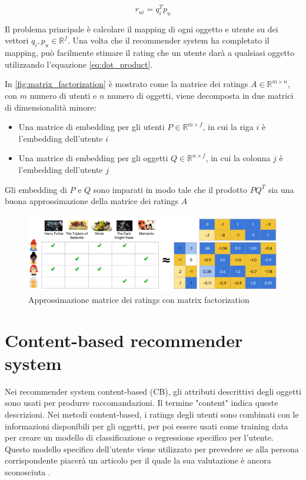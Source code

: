 \documentclass[12pt,italian]{report}
\begin{document}
\begin{equation} \label{eq:dot_product}
r_{ui} = q_i^Tp_u
\end{equation}

Il problema principale è calcolare il mapping di ogni oggetto e utente su dei vettori $q_i, p_u \in \mathbb{R}^f$. Una volta che il recommender system ha completato il mapping, può facilmente stimare il rating che un utente darà a qualsiasi oggetto utilizzando l'equazione \ref{eq:dot_product}. 

In \autoref{fig:matrix_factorization} è mostrato come la matrice dei ratings $A \in \mathbb{R}^{m \times n}$, con $m$ numero di utenti e $n$ numero di oggetti, viene decomposta in due matrici di dimensionalità minore:

\begin{itemize}
	\item Una matrice di embedding per gli utenti $P \in \mathbb{R}^{m \times f}$, in cui la riga $i$ è l'embedding dell'utente $i$
	\item Una matrice di embedding per gli oggetti $Q \in \mathbb{R}^{n \times f}$, in cui la colonna $j$ è l'embedding dell'utente $j$
\end{itemize}

Gli embedding di $P$ e $Q$ sono imparati in modo tale che il prodotto $PQ^T$ sia una buona approssimazione della matrice dei ratings $A$

\begin{figure}
  \includegraphics[width=\linewidth]{immagini/matrix_factorization.pdf}
  \caption{Approssimazione matrice dei ratings con matrix factorization}
  \label{fig:matrix_factorization}
\end{figure}

\section{Content-based recommender system}
Nei recommender system content-based (CB), gli attributi descrittivi degli oggetti sono usati per produrre raccomandazioni. Il termine "content" indica queste descrizioni. Nei metodi content-based, i ratings degli utenti sono combinati con le informazioni disponibili per gli oggetti, per poi essere usati come training data per creare un modello di classificazione o regressione specifico per l'utente. Questo modello specifico dell'utente viene utilizzato per prevedere se alla persona corrispondente piacerà un articolo per il quale la sua valutazione è ancora sconosciuta \cite{recsys-book}.
\end{document}
